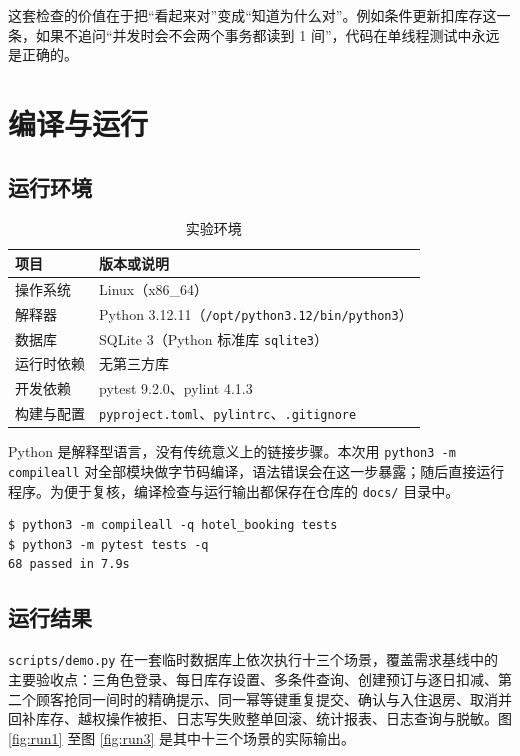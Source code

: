 \documentclass[11pt,a4paper,fontset=none]{ctexart}
\begin{document}
这套检查的价值在于把“看起来对”变成“知道为什么对”。例如条件更新扣库存这一条，如果不追问“并发时会不会两个事务都读到 1 间”，代码在单线程测试中永远是正确的。

\section{编译与运行}

\subsection{运行环境}

\begin{table}[H]
\centering
\caption{实验环境}
\small
\begin{tabular}{ll}
\toprule
项目 & 版本或说明 \\
\midrule
操作系统 & Linux（x86\_64）\\
解释器 & Python 3.12.11（\texttt{/opt/python3.12/bin/python3}）\\
数据库 & SQLite 3（Python 标准库 \texttt{sqlite3}）\\
运行时依赖 & 无第三方库 \\
开发依赖 & pytest 9.2.0、pylint 4.1.3 \\
构建与配置 & \texttt{pyproject.toml}、\texttt{pylintrc}、\texttt{.gitignore} \\
\bottomrule
\end{tabular}
\end{table}

Python 是解释型语言，没有传统意义上的链接步骤。本次用 \texttt{python3 -m compileall} 对全部模块做字节码编译，语法错误会在这一步暴露；随后直接运行程序。为便于复核，编译检查与运行输出都保存在仓库的 \texttt{docs/} 目录中。

\begin{lstlisting}
$ python3 -m compileall -q hotel_booking tests
$ python3 -m pytest tests -q
68 passed in 7.9s
\end{lstlisting}

\subsection{运行结果}

\texttt{scripts/demo.py} 在一套临时数据库上依次执行十三个场景，覆盖需求基线中的主要验收点：三角色登录、每日库存设置、多条件查询、创建预订与逐日扣减、第二个顾客抢同一间时的精确提示、同一幂等键重复提交、确认与入住退房、取消并回补库存、越权操作被拒、日志写失败整单回滚、统计报表、日志查询与脱敏。图 \ref{fig:run1} 至图 \ref{fig:run3} 是其中十三个场景的实际输出。
\end{document}
